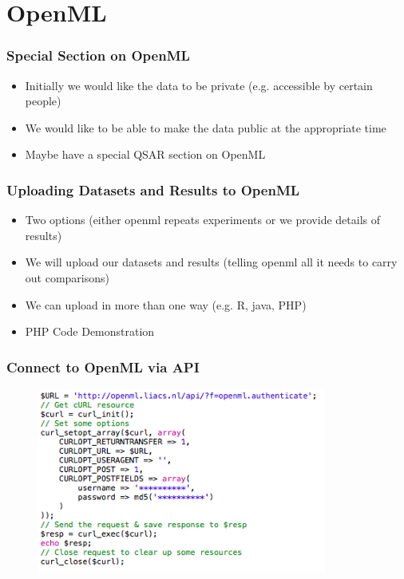 \documentclass[compress]{beamer}
\begin{document}
\section{OpenML}

\begin{frame}
\frametitle{Special Section on OpenML} 
\begin{itemize}%
 \item Initially we would like the data to be private (e.g. accessible by certain people)
 \item We would like to be able to make the data public at the appropriate time
 \item Maybe have a special QSAR section on OpenML
\end{itemize}
\end{frame}


\begin{frame}
\frametitle{Uploading Datasets and Results to OpenML} 
\begin{itemize}%
 \item Two options (either openml repeats experiments or we provide details of results)
 \item We will upload our datasets and results (telling openml all it needs to carry out comparisons)
 \item We can upload in more than one way (e.g. R, java, PHP)
 \item PHP Code Demonstration
\end{itemize}
\end{frame}

\begin{frame}
\frametitle{Connect to OpenML via API} 

\begin{figure}[h!]
  \centering
    \includegraphics[width=0.85\textwidth]{openml-connect}
\end{figure}

\end{frame}
\end{document}
